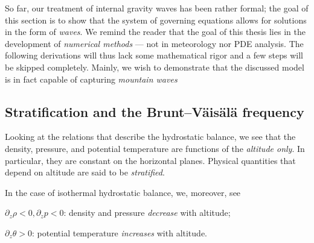 \documentclass[../main.tex]{subfiles}
\begin{document}
So far, our treatment of internal gravity waves has been rather formal; the goal of this section is to show that the system of governing equations  allows for solutions in the form of \emph{waves}. 
We remind the reader that the goal of this thesis lies in the development of \emph{numerical methods} --- not in meteorology nor PDE analysis. The following derivations will thus lack some mathematical rigor and a few steps will be skipped completely. Mainly, we wish to demonstrate that the discussed model is in fact capable of capturing \emph{mountain waves}

\subsection{Stratification and the Brunt–Väisälä frequency}
\label{sec:STRAT}

Looking at the relations that describe the hydrostatic balance, we see that the density, pressure, and potential temperature are functions of the \emph{altitude only}. In particular, they are constant on the horizontal planes. Physical quantities that depend on altitude are said to be \emph{stratified}.

In the case of isothermal hydrostatic balance, we, moreover, see

\begin{compactitem}
\item $\partial_z \rho < 0, \partial_{z} p < 0$: density and pressure \emph{decrease} with altitude;
\item $\partial_z \theta > 0$: potential temperature \emph{increases} with altitude.
\end{compactitem}
\end{document}
